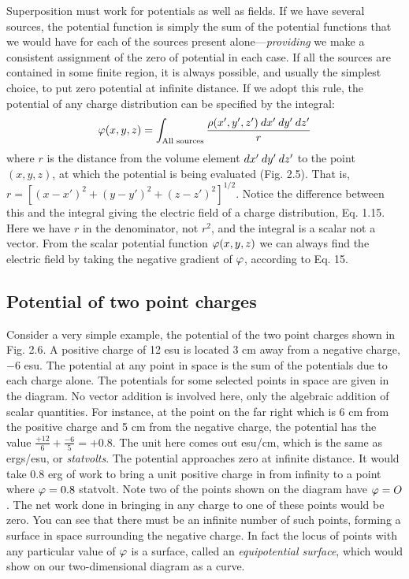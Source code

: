 Superposition must work for potentials as well as fields. If we
have several sources, the potential function is simply the sum of the
potential functions that we would have for each of the sources present
alone---\emph{providing} we make a consistent assignment of the zero of
potential in each case. If all the sources are contained in some finite
region, it is always possible, and usually the simplest choice, to put
zero potential at infinite distance. If we adopt this rule, the potential
of any charge distribution can be specified by the integral:
\begin{equation}
  \varphi(x,y,z) = \int_{\text{All sources}} \frac{\rho(x',y',z')\:d x'\:d y'\:d z'}{r}
\end{equation}
where $r$ is the distance from the volume element $d x'\:d y'\:d z'$ to the
point $(x,y,z)$, at which the potential is being evaluated (Fig. 2.5).
That is, $r = [(x - x')^2 + (y - y')^2 + (z - z')^2]^{1/2}$. Notice the
difference between this and the integral giving the electric field of a
charge distribution, Eq. 1.15. Here we have $r$ in the denominator,
not $r^2$, and the integral is a scalar not a vector. From the scalar potential
function $\varphi(x,y,z)$ we can always find the electric field by taking
the negative gradient of $\varphi$, according to Eq. 15.

\subsection{Potential of two point charges}

 Consider a very simple example,
the potential of the two point charges shown in Fig. 2.6. A positive
charge of 12 esu is located 3 cm away from a negative charge, $- 6$ esu.
The potential at any point in space is the sum of the potentials due to
each charge alone. The potentials for some selected points in space
are given in the diagram. No vector addition is involved here, only
the algebraic addition of scalar quantities. For instance, at the point
on the far right which is 6 cm from the positive charge and 5 cm from
the negative charge, the potential has the value $\frac{+12}{6}+\frac{-6}{5}=+0.8$.
The unit here comes out esu/cm, which is the same as ergs/esu, or
\emph{statvolts}. The potential approaches zero at infinite distance. It
would take 0.8 erg of work to bring a unit positive charge in from
infinity to a point where $\varphi = 0.8$ statvolt. Note two of the points
shown on the diagram have $\varphi = O$. The net work done in bringing
in any charge to one of these points would be zero. You can see that
there must be an infinite number of such points, forming a surface in
space surrounding the negative charge. In fact the locus of points
with any particular value of $\varphi$ is a surface, called an \emph{equipotential
surface}, which would show on our two-dimensional diagram as a
curve.

